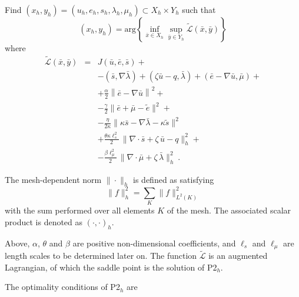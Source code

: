 \documentclass{article}
\begin{document}
\bigskip

 Find $(x_h,y_h)=\left ( u_h, e_h, s_h, \lambda_h, \mu_h\right ) \subset X_h\times Y_h$ such that 
\begin{equation}
(x_h,y_h)= \mbox{arg} \left \{ \inf_{\bar{x}\in X_h} \sup_{\bar{y}\in Y_h} 
\tilde{\mathcal{L}}(\bar{x},\bar{y})
\right \}
\end{equation}
where
\begin{eqnarray}
\tilde{\mathcal{L}}(\bar{x},\bar{y})&=&J(\bar{u},\bar{e},\bar{s})+ \nonumber \\
& &-\left ( \bar{s},\nabla \bar{\lambda} \right ) + \left (\zeta \bar{u} - q , \bar{\lambda} \right )  
+ \left ( \bar{e}-\nabla \bar{u}, \bar{\mu} \right ) +\nonumber \\
& &+\frac{\alpha}{2} \left \| \bar{e} - \nabla \bar{u} \right \|^2 + \\
& &-\frac{\gamma}{2} \|\bar{e}+\bar{\mu}-\tilde{e}\|^2 + \nonumber \\
& &-\frac{\eta}{2\kappa} \|\kappa \bar{s} - \nabla \bar{\lambda} - \kappa \tilde{s}\|^2 \nonumber \\
& &+ \frac{\theta \kappa \ell_s^2 }{2}\, \|\nabla \cdot \bar{s} + \zeta\, \bar{u} - q \|_h^2 + \nonumber \\
& & - \frac{\beta \ell_{\mu}^2 }{2}\, \|\nabla \cdot \bar{\mu} + \zeta\, \bar{\lambda} \|_h^2~.
\end{eqnarray}

\bigskip

The mesh-dependent norm $\|\cdot\|_h$ is defined as satisfying
\begin{equation}
\|f\|_h^2 = \sum_K \|f\|^2_{L^2(K)} 
\end{equation}
with the sum performed over all elements $K$ of the mesh. The associated scalar product is denoted as $\left ( \cdot, \cdot \right )_h$.

Above, $\alpha$, $\theta$ and $\beta$ are positive non-dimensional coefficients, and $\ell_s$ and $\ell_{\mu}$ are length scales to be determined later on. The function $\tilde{\mathcal{L}}$ is an augmented Lagrangian, of which the saddle point is the solution of P2$_h$. %

The optimality conditions of P2$_h$ are
\end{document}
